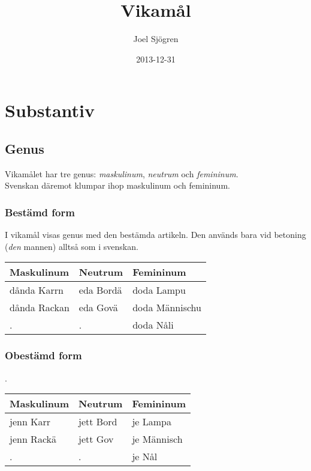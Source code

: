 \documentclass[a4paper]{memoir}
\newcommand{\eline}{\\[\baselineskip]} %
\newenvironment{mytable}[2]
{
  \eline
  \begin{tabular}{#1}
  \hline #2\\ \hline
}
{ \end{tabular} }
\newenvironment{wlistmnf} %
{ \begin{mytable}{ l l l }{Maskulinum & Neutrum & Femininum} }
{ \end{mytable} }
\begin{document}
\title{Vikamål}
\author{Joel Sjögren}
\date{2013-12-31}
\maketitle
\tableofcontents


\part{Substantiv}
  \chapter{Genus}
    Vikamålet har tre genus: \emph{maskulinum}, \emph{neutrum} och \emph{femininum}.\\Svenskan däremot klumpar ihop maskulinum och femininum.
    \section{Bestämd form}
      I vikamål visas genus med den bestämda artikeln. Den används bara vid betoning (\emph{den} mannen) alltså som i svenskan.
      \begin{wlistmnf}
        dånda Karrn & eda Bordä & doda Lampu\\
        dånda Rackan & eda Govä & doda Männischu\\
        . & . & doda Nåli
      \end{wlistmnf}
    \section{Obestämd form}
      .
      \begin{wlistmnf}
        jenn Karr & jett Bord & je Lampa\\
        jenn Rackä & jett Gov & je Männisch\\
        . & . & je Nål
      \end{wlistmnf}
\end{document}
